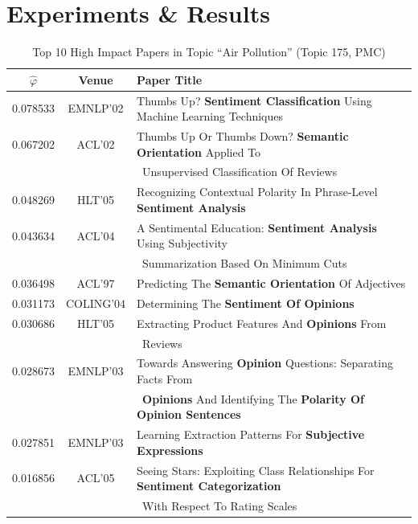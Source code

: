 \section{Experiments \& Results} \label{sec::citation-exp}

\begin{table}[t!]
\caption{Top 10 High Impact Papers in Topic ``Sentiment Analysis'' (Topic 89,
        AAN)}\label{tab:high_impact_aan}
\begin{tabular}{|c|c|l|}
\hline
$\hat\varphi$	& Venue &	Paper Title \\
\hline\hline
0.078533		& EMNLP'02	& 	Thumbs Up? \textbf{Sentiment Classification} Using
  Machine Learning Techniques \\
0.067202		& ACL'02		& 	Thumbs Up Or Thumbs Down? \textbf{Semantic
  Orientation} Applied To \\
  && \, Unsupervised Classification Of Reviews \\
0.048269		& HLT'05		&	  Recognizing Contextual Polarity In Phrase-Level
  \textbf{Sentiment Analysis} \\
0.043634		& ACL'04		&	A Sentimental Education: \textbf{Sentiment Analysis}
  Using Subjectivity \\
  && \, Summarization  Based On Minimum Cuts \\
0.036498		& ACL'97		&	Predicting The \textbf{Semantic Orientation} Of
  Adjectives \\
0.031173		& COLING'04	&	Determining The \textbf{Sentiment Of Opinions}	\\
0.030686		& HLT'05		&	Extracting Product Features And \textbf{Opinions} From
  \\ && \, Reviews \\
0.028673		& EMNLP'03	&	Towards Answering \textbf{Opinion} Questions:
  Separating Facts From \\
  && \, \textbf{Opinions} And Identifying The \textbf{Polarity Of Opinion
    Sentences}	\\
0.027851		& EMNLP'03	&	Learning Extraction Patterns For \textbf{Subjective
  Expressions} \\
0.016856		& ACL'05		&	Seeing Stars: Exploiting Class Relationships For
  \textbf{Sentiment Categorization} \\
  && \, With Respect To Rating Scales \\
\hline
\hline %
\end{tabular}

\caption{Top 10 High Impact Papers in Topic ``Air Pollution'' (Topic 175,
    PMC)}\label{tab:high_impact_pmc}


\end{table}

